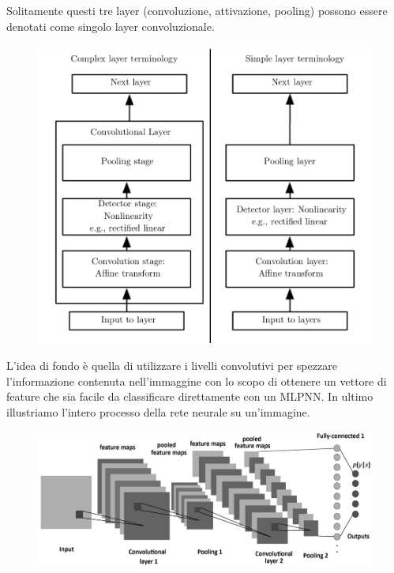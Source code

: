 \documentclass[12pt]{article}
\begin{document}
Solitamente questi tre layer (convoluzione, attivazione, pooling)
possono essere denotati come singolo layer convoluzionale.

\begin{figure}[H]{}
    \centering
    \includegraphics[scale=2]{../images/cl.png}
    \label{fig:cc}
\end{figure}

L'idea di fondo è quella di utilizzare i livelli convolutivi
per spezzare l'informazione contenuta nell'immaggine con lo
scopo di ottenere un vettore di feature che sia facile
da classificare direttamente con un MLPNN.
In ultimo illustriamo l'intero processo della rete neurale su un'immagine.

\begin{figure}[H]{}
    \centering
    \includegraphics[scale=1]{../images/convex.png}
    \label{fig:cc}
\end{figure}
\end{document}
